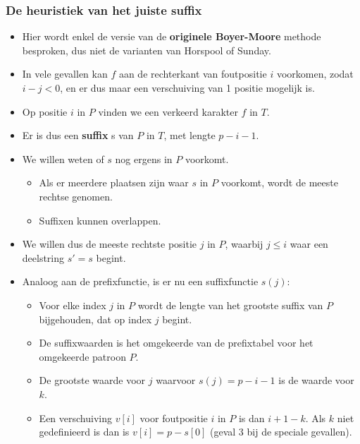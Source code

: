 \subsubsection{De heuristiek van het juiste suffix}
\begin{itemize}
    \item Hier wordt enkel de versie van de \textbf{originele Boyer-Moore} methode besproken, dus niet de varianten van Horspool of Sunday.
    \item In vele gevallen kan $f$ aan de rechterkant van foutpositie $i$ voorkomen, zodat $i - j < 0$, en er dus maar een verschuiving van 1 positie mogelijk is.
    \item Op positie $i$ in $P$ vinden we een verkeerd karakter $f$ in $T$.
    \item Er is dus een \textbf{suffix} s van $P$ in $T$, met lengte $p - i - 1$.
    \item We willen weten of $s$ nog ergens in $P$ voorkomt.
    \begin{itemize}
        \item Als er meerdere plaatsen zijn waar $s$ in $P$ voorkomt, wordt de meeste rechtse genomen.
        \item Suffixen kunnen overlappen.
    \end{itemize}
    \item We willen dus de meeste rechtste positie $j$ in $P$, waarbij $j \leq i$ waar een deelstring $s' = s$ begint.
    \item Analoog aan de prefixfunctie, is er nu een suffixfunctie $s(j)$:
    \begin{itemize}
        \item Voor elke index $j$ in $P$ wordt de lengte van het grootste suffix van $P$ bijgehouden, dat op index $j$ begint.
        \item De suffixwaarden is het omgekeerde van de prefixtabel voor het omgekeerde patroon $P$.
        \item De grootste waarde voor $j$ waarvoor $s(j) = p - i - 1$ is de waarde voor $k$.
        \item Een verschuiving $v[i]$ voor foutpositie $i$ in $P$ is dan $i + 1 - k$. Als $k$ niet gedefinieerd is dan is $v[i] = p - s[0]$ (geval 3 bij de speciale gevallen).
    \end{itemize}



\end{itemize}
